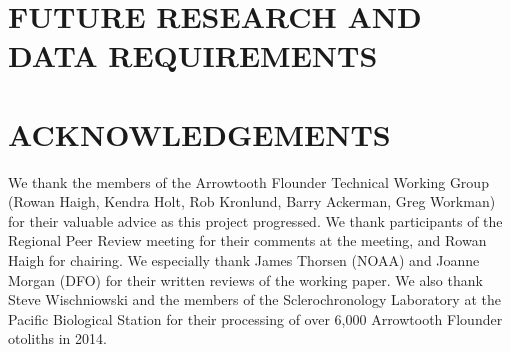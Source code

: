 \section{FUTURE RESEARCH AND DATA REQUIREMENTS}

\section{ACKNOWLEDGEMENTS}

We thank the members of the Arrowtooth Flounder Technical Working Group (Rowan Haigh, Kendra Holt, Rob Kronlund, Barry Ackerman, Greg Workman) for their valuable advice as this project progressed. We thank participants of the Regional Peer Review meeting for their comments at the meeting, and Rowan Haigh for chairing. We especially thank James Thorsen (NOAA) and Joanne Morgan (DFO) for their written reviews of the working paper. We also thank Steve Wischniowski and the members of the Sclerochronology Laboratory at the Pacific Biological Station for their processing of over 6,000 Arrowtooth Flounder otoliths in 2014.




\clearpage

